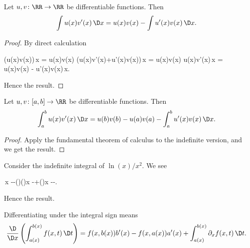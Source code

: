 \begin{node}\label{calculus:integral-000C}%
\begin{node}\label{calculus:integral-000D}%
Let $u,v\colon\RR\to\RR$ be differentiable functions. Then
\[\int u(x)v'(x)\,\D x=u(x)v(x)-\int u'(x)v(x)\,\D x.\]
\begin{proof}
By direct calculation
\begin{calculation}
\int{}(u(x)v(x))\,\D x = u(x)v(x)
\int(u(x)v'(x)+u'(x)v(x))\,\D x = u(x)v(x)
\int u(x)v'(x)\,\D x = u(x)v(x) - \int u'(x)v(x)\,\D x.
\end{calculation}
Hence the result.
\end{proof}
\end{node}

\begin{node}\label{calculus:integral-000E}%
Let $u,v\colon[a,b]\to\RR$ be differentiable functions. Then
\[\int^{b}_{a} u(x)v'(x)\,\D x=u(b)v(b)-u(a)v(a)-\int^{b}_{a} u'(x)v(x)\,\D x.\]
\begin{proof}
Apply the fundamental theorem of calculus to the indefinite version, and
we get the result.
\end{proof}
\end{node}

\begin{example}\label{calculus:integral-000F}%
Consider the indefinite integral of $\ln(x)/x^{2}$. We see
\begin{calculation}
\int{}\,\D x
--\int\left(\right)\left(\right)\D x
-+\int\left(\right)\D x
--.
\end{calculation}
Hence the result.
\end{example}

\end{node} %


\begin{node}\label{calculus:integral-000G}%
Differentiating under the integral sign means
\begin{equation*}
\frac{\D}{\D x}\left(\int^{b(x)}_{a(x)}f(x,t)\,\D t\right)
=f(x,b(x))b'(x) - f(x,a(x))a'(x)+\int^{b(x)}_{a(x)}\partial_{x}f(x,t)\,\D t.
\end{equation*}
\end{node}